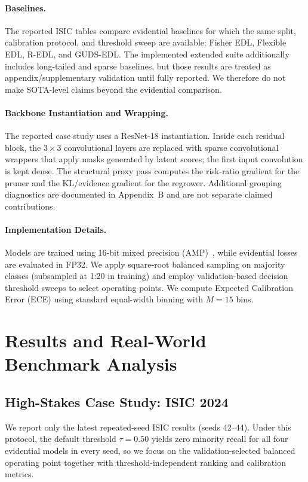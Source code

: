 \documentclass[letterpaper]{article} %
\begin{document}
\paragraph{Baselines.} The reported ISIC tables compare evidential baselines for which the same split, calibration protocol, and threshold sweep are available: Fisher EDL, Flexible EDL, R-EDL, and GUDS-EDL. The implemented extended suite additionally includes long-tailed and sparse baselines, but those results are treated as appendix/supplementary validation until fully reported. We therefore do not make SOTA-level claims beyond the evidential comparison.

\paragraph{Backbone Instantiation and Wrapping.}
The reported case study uses a ResNet-18 instantiation. Inside each residual block, the $3 \times 3$ convolutional layers are replaced with sparse convolutional wrappers that apply masks generated by latent scores; the first input convolution is kept dense. The structural proxy pass computes the risk-ratio gradient for the pruner and the KL/evidence gradient for the regrower. Additional grouping diagnostics are documented in Appendix~B and are not separate claimed contributions.

\paragraph{Implementation Details.} Models are trained using 16-bit mixed precision (AMP)~\cite{micikevicius2018mixed}, while evidential losses are evaluated in FP32. We apply square-root balanced sampling on majority classes (subsampled at 1:20 in training) and employ validation-based decision threshold sweeps to select operating points. We compute Expected Calibration Error (ECE) using standard equal-width binning with $M=15$ bins.

\section{Results and Real-World Benchmark Analysis}\label{sec:results}

\subsection{High-Stakes Case Study: ISIC 2024}\label{subsec:isic_case_study}
We report only the latest repeated-seed ISIC results (seeds 42--44). Under this protocol, the default threshold $\tau=0.50$ yields zero minority recall for all four evidential models in every seed, so we focus on the validation-selected balanced operating point together with threshold-independent ranking and calibration metrics.
\end{document}
